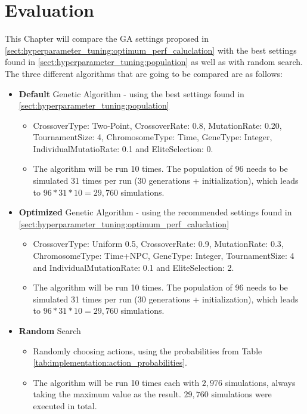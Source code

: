 \chapter{Evaluation}
\label{chap:evaluation}
This Chapter will compare the GA settings proposed in \ref{sect:hyperparameter_tuning:optimum_perf_caluclation} with the best settings found in \ref{sect:hyperparameter_tuning:population} as well as with random search. The three different algorithms that are going to be compared are as follows:
\begin{itemize}
	\item \textbf{Default} Genetic Algorithm - using the best settings found in \ref{sect:hyperparameter_tuning:population}
	\begin{itemize}
		\item CrossoverType: Two-Point, CrossoverRate: 0.8, MutationRate: 0.20, TournamentSize: 4, ChromosomeType: Time, GeneType: Integer, IndividualMutatioRate: 0.1 and EliteSelection: 0. 
		\item The algorithm will be run 10 times. The population of 96 needs to be simulated 31 times per run (30 generations + initialization), which leads to $96 * 31 * 10 = 29,760$ simulations.
	\end{itemize}
	\item \textbf{Optimized} Genetic Algorithm - using the recommended settings found in \ref{sect:hyperparameter_tuning:optimum_perf_caluclation}
	\begin{itemize}
		\item CrossoverType: Uniform 0.5, CrossoverRate: 0.9, MutationRate: 0.3, ChromosomeType: Time+NPC, GeneType: Integer, TournamentSize: 4 and IndividualMutationRate: 0.1 and EliteSelection: 2. 
		\item The algorithm will be run 10 times. The population of 96 needs to be simulated 31 times per run (30 generations + initialization), which leads to $96 * 31 * 10 = 29,760$ simulations.
	\end{itemize}
	\item \textbf{Random} Search
	\begin{itemize}
		\item Randomly choosing actions, using the probabilities from Table \ref{tab:implementation:action_probabilities}. 
		\item The algorithm will be run 10 times each with $2,976$ simulations, always taking the maximum value as the result. $29,760$ simulations were executed in total.
	\end{itemize}
\end{itemize}


